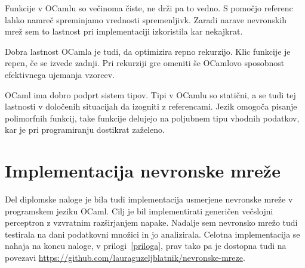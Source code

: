 \documentclass[mat1]{fmfdelo}
\begin{document}
Funkcije v OCamlu so večinoma čiste, ne drži pa to vedno. S pomočjo referenc lahko namreč spreminjamo vrednosti spremenljivk. Zaradi narave nevronskih mrež sem to lastnost pri implementaciji izkoristila kar nekajkrat.

Dobra lastnost OCamla je tudi, da optimizira repno rekurzijo. Klic funkcije je repen, če se izvede zadnji. Pri rekurziji gre omeniti še OCamlovo sposobnost efektivnega ujemanja vzorcev. 

OCaml ima dobro podprt sistem tipov. Tipi v OCamlu so statični, a se tudi tej lastnosti v določenih situacijah da izogniti z referencami. Jezik omogoča pisanje polimorfnih funkcij, take funkcije delujejo na poljubnem tipu vhodnih podatkov, kar je pri programiranju dostikrat zaželeno. 
%
%
%
\section{Implementacija nevronske mreže}
Del diplomske naloge je bila tudi implementacija usmerjene nevronske mreže v programskem jeziku OCaml. Cilj je bil implementirati generičen večslojni perceptron z vzvratnim razširjanjem napake. Nadalje sem nevronsko mrežo tudi testirala na dani podatkovni množici in jo analizirala. Celotna implementacija se nahaja na koncu naloge, v prilogi~\ref{priloga}, prav tako pa je dostopna tudi na povezavi \url{https://github.com/lauraguzeljblatnik/nevronske-mreze}.
%
\end{document}
